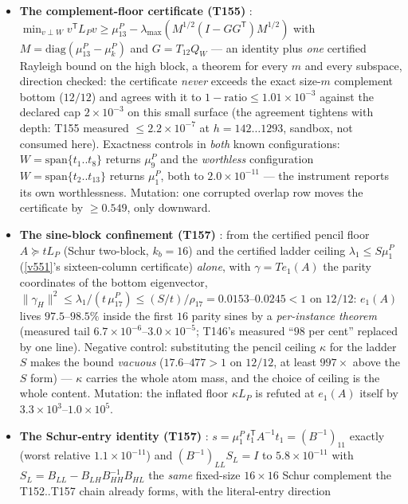 \documentclass[11pt,a4paper]{article}
\begin{document}
\begin{itemize}[leftmargin=1.5em]
\item \textbf{The complement-floor certificate (T155)} \mE:
$\min_{v\perp W}v^{\mathsf T}L_Pv\ge\mu^P_{13}-\lambda_{\max}(M^{1/2}(I-GG^{\mathsf T})
M^{1/2})$ with $M=\mathrm{diag}(\mu^P_{13}-\mu^P_k)$ and $G=T_{12}Q_W$ --- an identity
plus \emph{one} certified Rayleigh bound on the high block, a theorem for every $m$ and
every subspace, direction checked: the certificate \emph{never} exceeds the exact size-$m$
complement bottom ($12/12$) and agrees with it to $1-\mathrm{ratio}\le1.01\times10^{-3}$
against the declared cap $2\times10^{-3}$ on this small surface (the agreement tightens
with depth: T155 measured $\le2.2\times10^{-7}$ at $h=142\ldots1293$, sandbox, not
consumed here). Exactness controls in \emph{both} known configurations:
$W=\mathrm{span}\{t_1..t_8\}$ returns $\mu^P_9$ and the \emph{worthless} configuration
$W=\mathrm{span}\{t_2..t_{13}\}$ returns $\mu^P_1$, both to $2.0\times10^{-11}$ --- the
instrument reports its own worthlessness. Mutation: one corrupted overlap row moves the
certificate by $\ge0.549$, only downward.
\item \textbf{The sine-block confinement (T157)} \mE: from the certified pencil floor
$A\succeq tL_P$ (Schur two-block, $k_b=16$) and the certified ladder ceiling
$\lambda_1\le S\mu^P_1$ (\vref{v551}'s sixteen-column certificate) \emph{alone}, with
$\gamma=Te_1(A)$ the parity coordinates of the bottom eigenvector,
$\|\gamma_H\|^2\le\lambda_1/(t\,\mu^P_{17})\le(S/t)/\rho_{17}=0.0153$--$0.0245<1$ on
$12/12$: $e_1(A)$ lives $97.5$--$98.5\%$ inside the first $16$ parity sines by a
\emph{per-instance theorem} (measured tail $6.7\times10^{-6}$--$3.0\times10^{-5}$; T146's
measured ``$98$ per cent'' replaced by one line). Negative control: substituting the
pencil ceiling $\kappa$ for the ladder $S$ makes the bound \emph{vacuous}
($17.6$--$477>1$ on $12/12$, at least $997\times$ above the $S$ form) --- $\kappa$ carries
the whole atom mass, and the choice of ceiling is the whole content. Mutation: the
inflated floor $\kappa L_P$ is refuted at $e_1(A)$ itself by
$3.3\times10^{3}$--$1.0\times10^{5}$.
\item \textbf{The Schur-entry identity (T157)} \mE:
$s=\mu^P_1\,t_1^{\mathsf T}A^{-1}t_1=(B^{-1})_{11}$ exactly (worst relative
$1.1\times10^{-11}$) and $(B^{-1})_{LL}S_L=I$ to $5.8\times10^{-11}$ with
$S_L=B_{LL}-B_{LH}B_{HH}^{-1}B_{HL}$ the \emph{same} fixed-size $16\times16$ Schur
complement the T152..T157 chain already forms, with the literal-entry direction

\end{itemize}
\end{document}
